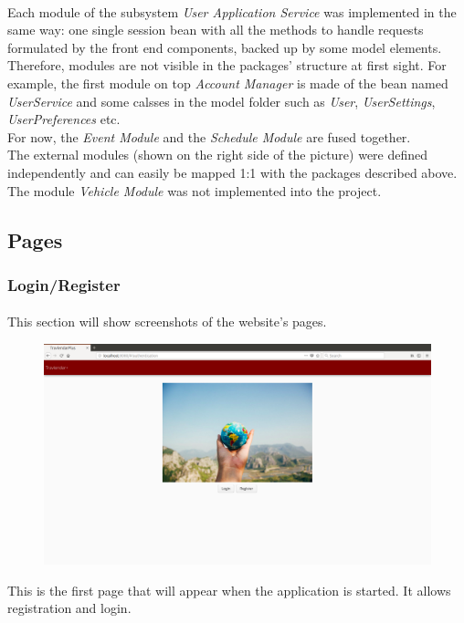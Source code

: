 \documentclass{article}
\begin{document}
			\paragraph{}
Each module of the subsystem \textit{User Application Service} was implemented in the same way: one single session bean with all the methods to handle requests formulated by the front end components, backed up by some model elements. Therefore, modules are not visible in the packages' structure at first sight. For example, the first module on top \textit{Account Manager} is made of the bean named \textit{UserService} and some calsses in the model folder such as \textit{User}, \textit{UserSettings}, \textit{UserPreferences} etc.\\For now, the \textit{Event Module} and the \textit{Schedule Module} are fused together. \\The external modules (shown on the right side of the picture) were defined independently and can easily be mapped 1:1 with the packages described above.\\The module \textit{Vehicle Module} was not implemented into the project.
\newpage
		\subsection{Pages}
			\subsubsection{Login/Register}
		\paragraph{}This section will show screenshots of the website's pages.
			\begin{figure}[H]
			\includegraphics[width=\linewidth]{Images/Pages/1-Login.png}
			\label{fig:Login}
			\end{figure}
		This is the first page that will appear when the application is started. It allows registration and login.
\end{document}
